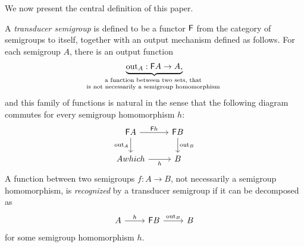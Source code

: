  
 
 We now present the central definition of this paper. 

\newcommand{\emptytester}{2}
\begin{definition}
    A \emph{transducer semigroup} is defined to be a functor $\mathsf F$ 
    from the category of semigroups to itself, together with an output mechanism defined as follows. For each semigroup $A$, there is an output function 
    \begin{align*}
    \myunderbrace{\outfun_A : \functor A \to A,}{a function between two sets, that \\ is not necessarily a semigroup homomorphism}
    \end{align*}
    and this family of functions is natural in the sense that the following diagram commutes for every semigroup homomorphism $h$: 
    \[
    \begin{tikzcd}
    \functor A 
    \ar[r,"\functor h"]
    \ar[d,"\outfun_A"']
    &
    \functor B
    \ar[d,"\outfun_B"]
    \\
    A which
    \ar[r,"h"']
    &
    B
    \end{tikzcd}
    \]
    A function between two semigroups $f : A \to B$, not necessarily a semigroup homomorphism, is  \emph{recognized} by a transducer semigroup if it can be decomposed as 
    \[
        \begin{tikzcd}
        A 
        \ar[r,"h"]
        &
        \functor B
        \ar[r,"\outfun_B"]
        &
        B
        \end{tikzcd}
        \]
        for some  semigroup homomorphism $h$.
\end{definition}

